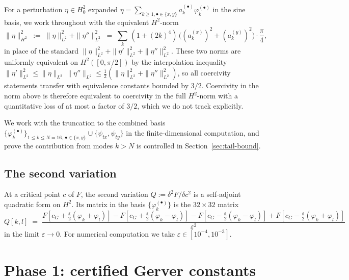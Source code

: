 \documentclass[11pt]{amsart}
\theoremstyle{plain}
\theoremstyle{definition}
\newcommand{\eps}{\varepsilon}
\newcommand{\cG}{c_{G}}
\begin{document}
For a perturbation $\eta \in H^{2}_{0}$ expanded
$\eta = \sum_{k \geq 1, \bullet \in \{x, y\}}
a_{k}^{(\bullet)} \varphi_{k}^{(\bullet)}$ in the sine basis, we
work throughout with the equivalent $H^{2}$-norm
\begin{equation}\label{eq:weighted-H2-norm}
  \|\eta\|_{H^{2}}^{2} \;:=\;
  \|\eta\|_{L^{2}}^{2} + \|\eta''\|_{L^{2}}^{2}
  \;=\; \sum_{k} \, (1 + (2k)^{4}) \,
       \bigl( (a_{k}^{(x)})^{2} + (a_{k}^{(y)})^{2} \bigr)
       \cdot \frac{\pi}{4},
\end{equation}
in place of the standard $\|\eta\|_{L^{2}}^{2} + \|\eta'\|_{L^{2}}^{2}
+ \|\eta''\|_{L^{2}}^{2}$.  These two norms are uniformly equivalent
on $H^{2}([0,\pi/2])$ by the interpolation inequality
$\|\eta'\|_{L^{2}}^{2} \leq \|\eta\|_{L^{2}}\,\|\eta''\|_{L^{2}}
\leq \tfrac{1}{2}(\|\eta\|_{L^{2}}^{2} + \|\eta''\|_{L^{2}}^{2})$,
so all coercivity statements transfer with equivalence constants
bounded by $3/2$.  Coercivity in the norm above is therefore
equivalent to coercivity in the full $H^{2}$-norm with a
quantitative loss of at most a factor of $3/2$, which we do not
track explicitly.

We work with the truncation to the combined basis
$\{\varphi_{k}^{(\bullet)}\}_{1 \leq k \leq N=16, \, \bullet \in
\{x, y\}} \cup \{\psi_{tx}, \psi_{ty}\}$ in the
finite-dimensional computation, and prove the contribution from
modes $k > N$ is controlled in
Section~\ref{sec:tail-bound}.

\subsection{The second variation}
At a critical point $c$ of $F$, the second variation
$Q := \delta^{2} F / \delta c^{2}$ is a self-adjoint quadratic form on
$H^{2}$.  Its matrix in the basis $\{\varphi_{k}^{(\bullet)}\}$ is the
$32 \times 32$ matrix
\begin{equation}\label{eq:Q-FD}
  Q[k, l] \;=\;
   \frac{F[\cG + \tfrac{\eps}{2}(\varphi_k + \varphi_l)]
       - F[\cG + \tfrac{\eps}{2}(\varphi_k - \varphi_l)]
       - F[\cG - \tfrac{\eps}{2}(\varphi_k - \varphi_l)]
       + F[\cG - \tfrac{\eps}{2}(\varphi_k + \varphi_l)]}
        {\eps^{2}}
\end{equation}
in the limit $\eps \to 0$.  For numerical computation we take
$\eps \in [10^{-4}, 10^{-3}]$.

\section{Phase 1: certified Gerver constants}\label{sec:phase1}
\end{document}
